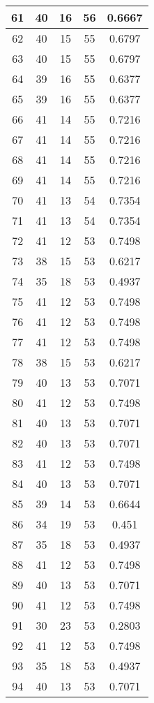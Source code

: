 \documentclass[letterpaper, 12pt]{article}
\begin{document}
\begin{longtable}{|c|c|c|c|c|}
\hline
61 & 40 & 16 & 56 & 0.6667 \\
\hline
62 & 40 & 15 & 55 & 0.6797 \\
\hline
63 & 40 & 15 & 55 & 0.6797 \\
\hline
64 & 39 & 16 & 55 & 0.6377 \\
\hline
65 & 39 & 16 & 55 & 0.6377 \\
\hline
66 & 41 & 14 & 55 & 0.7216 \\
\hline
67 & 41 & 14 & 55 & 0.7216 \\
\hline
68 & 41 & 14 & 55 & 0.7216 \\
\hline
69 & 41 & 14 & 55 & 0.7216 \\
\hline
70 & 41 & 13 & 54 & 0.7354 \\
\hline
71 & 41 & 13 & 54 & 0.7354 \\
\hline
72 & 41 & 12 & 53 & 0.7498 \\
\hline
73 & 38 & 15 & 53 & 0.6217 \\
\hline
74 & 35 & 18 & 53 & 0.4937 \\
\hline
75 & 41 & 12 & 53 & 0.7498 \\
\hline
76 & 41 & 12 & 53 & 0.7498 \\
\hline
77 & 41 & 12 & 53 & 0.7498 \\
\hline
78 & 38 & 15 & 53 & 0.6217 \\
\hline
79 & 40 & 13 & 53 & 0.7071 \\
\hline
80 & 41 & 12 & 53 & 0.7498 \\
\hline
81 & 40 & 13 & 53 & 0.7071 \\
\hline
82 & 40 & 13 & 53 & 0.7071 \\
\hline
83 & 41 & 12 & 53 & 0.7498 \\
\hline
84 & 40 & 13 & 53 & 0.7071 \\
\hline
85 & 39 & 14 & 53 & 0.6644 \\
\hline
86 & 34 & 19 & 53 & 0.451 \\
\hline
87 & 35 & 18 & 53 & 0.4937 \\
\hline
88 & 41 & 12 & 53 & 0.7498 \\
\hline
89 & 40 & 13 & 53 & 0.7071 \\
\hline
90 & 41 & 12 & 53 & 0.7498 \\
\hline
91 & 30 & 23 & 53 & 0.2803 \\
\hline
92 & 41 & 12 & 53 & 0.7498 \\
\hline
93 & 35 & 18 & 53 & 0.4937 \\
\hline
94 & 40 & 13 & 53 & 0.7071 \\

\end{longtable}
\end{document}

